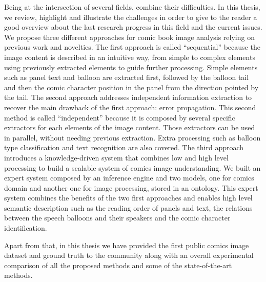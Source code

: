 Being at the intersection of several fields, combine their difficulties.
In this thesis, we review, highlight and illustrate the challenges in order to give to the reader a good overview about the last research progress in this field and the current issues.
We propose three different approaches for comic book image analysis relying on previous work and novelties.
The first approach is called ``sequential'' because the image content is described in an intuitive way, from simple to complex elements using previously extracted elements to guide further processing.
Simple elements such as panel text and balloon are extracted first, followed by the balloon tail and then the comic character position in the panel from the direction pointed by the tail.
The second approach addresses independent information extraction to recover the main drawback of the first approach: error propagation.
This second method is called ``independent'' because it is composed by several specific extractors for each elements of the image content.
Those extractors can be used in parallel, without needing previous extraction.
Extra processing such as balloon type classification and text recognition are also covered.
The third approach introduces a knowledge-driven system that combines low and high level processing to build a scalable system of comics image understanding.
We built an expert system composed by an inference engine and two models, one for comics domain and another one for image processing, stored in an ontology.
This expert system combines the benefits of the two first approaches and enables high level semantic description such as the reading order of panels and text, the relations between the speech balloons and their speakers and the comic character identification.

Apart from that, in this thesis we have provided the first public comics image dataset and ground truth to the community along with an overall experimental comparison of all the proposed methods and some of the state-of-the-art methods.



